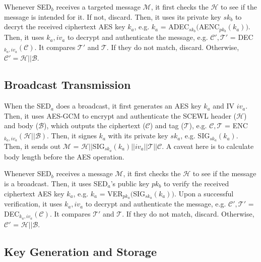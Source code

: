 \documentclass[11pt,oneside,onecolumn,letterpaper]{article}
\begin{document}
Whenever SED$_b$ receives a targeted message $\mathcal{M}$, it first checks the $\mathcal{H}$ to see if the message is intended for it. If not, discard.
Then, it uses its private key $sk_b$ to decryt the received ciphertext AES key $k_a$, e.g. $k_a$ = ADEC$_{sk_b}($AENC$_{pk_b}(k_a))$.
Then, it uses $k_a, iv_a$ to decrypt and authenticate the message, e.g. $\mathcal{C'}, \mathcal{T'}$ = DEC$_{k_a, iv_a}(\mathcal{C})$.
It compares $\mathcal{T'}$ and $\mathcal{T}$.
If they do not match, discard.
Otherwise, $\mathcal{C'}=\mathcal{H}||\mathcal{B}$.


\subsection{Broadcast Transmission}

When the SED$_a$ does a broadcast, it first generates an AES key $k_a$ and IV $iv_a$. 
Then, it uses AES-GCM to encrypt and authenticate the SCEWL header ($\mathcal{H}$) and body ($\mathcal{B}$), which outputs the ciphertext ($\mathcal{C}$) and tag ($\mathcal{T}$), e.g. $\mathcal{C}, \mathcal{T}$ = ENC$_{k_a, iv_a}(\mathcal{H} || \mathcal{B})$.
Then, it signes $k_a$ with its private key $sk_a$, e.g. SIG$_{sk_a}(k_a)$.
Then, it sends out $\mathcal{M}$ = $\mathcal{H} || $SIG$_{sk_a}(k_a)||iv_a||\mathcal{T}||\mathcal{C}$.
A caveat here is to calculate body length before the AES operation.

Whenever SED$_b$ receives a message $\mathcal{M}$, it first checks the $\mathcal{H}$ to see if the message is a broadcast.
Then, it uses SED$_a$'s public key $pk_b$ to verify the received ciphertext AES key $k_a$, e.g. $k_a$ = VER$_{pk_a}($SIG$_{sk_a}(k_a))$.
Upon a successful verification, it uses $k_a, iv_a$ to decrypt and authenticate the message, e.g. $\mathcal{C'}, \mathcal{T'}$ = DEC$_{k_a, iv_a}(\mathcal{C})$.
It compares $\mathcal{T'}$ and $\mathcal{T}$.
If they do not match, discard.
Otherwise, $\mathcal{C'}$ = $\mathcal{H}||\mathcal{B}$.

\subsection{Key Generation and Storage}
\end{document}
